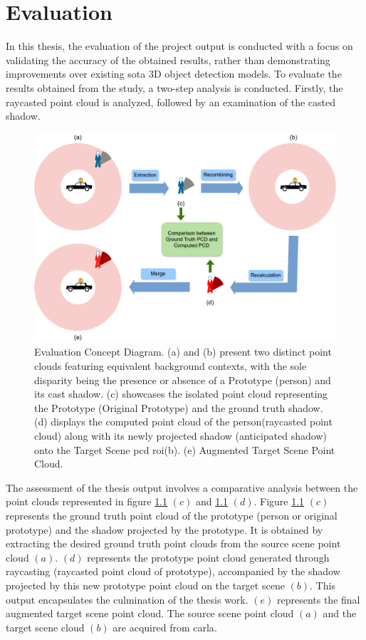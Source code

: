 \chapter{Evaluation}
In this thesis, the evaluation of the project output is conducted with a focus on validating the accuracy of the obtained results, rather than demonstrating improvements over existing \acrshort{sota} 3D object detection models.
To evaluate the results obtained from the study, a two-step analysis is conducted. Firstly, the raycasted point cloud is analyzed, followed by an examination of the casted shadow.

\begin{figure}[htb]
    \centering
    \includegraphics[width=0.75\linewidth]{97_graphics//evaluation/evaluation_step_diagram.pdf}
    \caption[Evaluation Concept Diagram.]{Evaluation Concept Diagram. (a) and (b) present two distinct point clouds featuring equivalent background contexts, with the sole disparity being the presence or absence of a Prototype (person) and its cast shadow. (c) showcases the isolated point cloud representing the Prototype (Original Prototype) and the ground truth shadow. (d) displays the computed point cloud of the person(raycasted point cloud) along with its newly projected shadow (anticipated shadow) onto the Target Scene \acrshort{pcd} \acrshort{roi}(b). (e) Augmented Target Scene Point Cloud.} 
    \label{fig:evaluation-evaluation_step_diagram}
\end{figure}

 The assessment of the thesis output involves a comparative analysis between the point clouds represented in figure \ref{fig:evaluation-evaluation_step_diagram} \((c)\) and \ref{fig:evaluation-evaluation_step_diagram} \((d)\). Figure \ref{fig:evaluation-evaluation_step_diagram} \((c)\) represents the ground truth point cloud of the prototype (person or original prototype) and the shadow projected by the prototype. It is obtained by extracting the desired ground truth point clouds from the source scene point cloud \((a)\). \((d)\) represents the prototype point cloud generated through raycasting (raycasted point cloud of prototype), accompanied by the shadow projected by this new prototype point cloud on the target scene \((b)\). This output encapsulates the culmination of the thesis work.
\((e)\) represents the final augmented target scene point cloud. The source scene point cloud \((a)\) and the target scene cloud \((b)\) are acquired from \acrshort{carla}.

